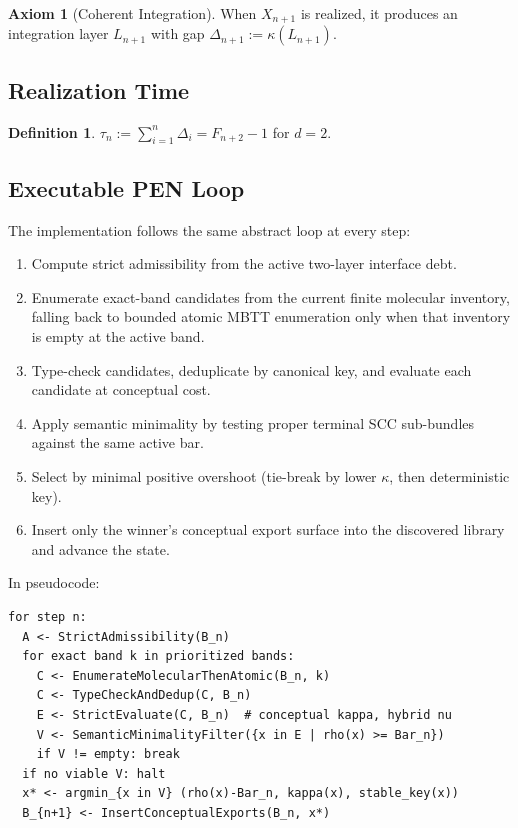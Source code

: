 \documentclass[11pt,a4paper]{article}
\theoremstyle{plain}
\theoremstyle{definition}
\newtheorem{definition}[theorem]{Definition}
\newtheorem{axiom}[theorem]{Axiom}
\theoremstyle{remark}
\begin{document}
\begin{axiom}[Coherent Integration]
\label{ax:integration}
When $X_{n+1}$ is realized, it produces an integration layer $L_{n+1}$ with gap $\Delta_{n+1} := \kappa(L_{n+1})$.
\end{axiom}

\subsection{Realization Time}

\begin{definition}
\label{def:tau}
$\tau_n := \sum_{i=1}^{n} \Delta_i = F_{n+2} - 1$ for $d = 2$.
\end{definition}

\subsection{Executable PEN Loop}
\label{sec:pen-loop}

The implementation follows the same abstract loop at every step:
\begin{enumerate}[nosep]
    \item Compute strict admissibility from the active two-layer interface debt.
    \item Enumerate exact-band candidates from the current finite molecular inventory, falling back to bounded atomic MBTT enumeration only when that inventory is empty at the active band.
    \item Type-check candidates, deduplicate by canonical key, and evaluate each candidate at conceptual cost.
    \item Apply semantic minimality by testing proper terminal SCC sub-bundles against the same active bar.
    \item Select by minimal positive overshoot (tie-break by lower $\kappa$, then deterministic key).
    \item Insert only the winner's conceptual export surface into the discovered library and advance the state.
\end{enumerate}

In pseudocode:
\begin{verbatim}
for step n:
  A <- StrictAdmissibility(B_n)
  for exact band k in prioritized bands:
    C <- EnumerateMolecularThenAtomic(B_n, k)
    C <- TypeCheckAndDedup(C, B_n)
    E <- StrictEvaluate(C, B_n)  # conceptual kappa, hybrid nu
    V <- SemanticMinimalityFilter({x in E | rho(x) >= Bar_n})
    if V != empty: break
  if no viable V: halt
  x* <- argmin_{x in V} (rho(x)-Bar_n, kappa(x), stable_key(x))
  B_{n+1} <- InsertConceptualExports(B_n, x*)
\end{verbatim}
\end{document}
